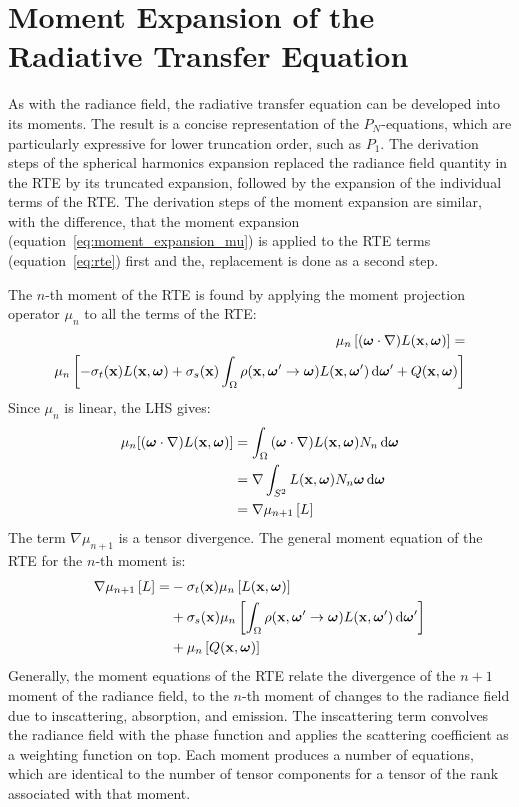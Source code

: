\section{Moment Expansion of the Radiative Transfer Equation}
\label{sec:da_moment_expansion_RTE}

As with the radiance field, the radiative transfer equation can be developed into its moments. The result is a concise representation of the $P_N$-equations, which are particularly expressive for lower truncation order, such as $P_1$. The derivation steps of the spherical harmonics expansion replaced the radiance field quantity in the RTE by its truncated expansion, followed by the expansion of the individual terms of the RTE. The derivation steps of the moment expansion are similar, with the difference, that the moment expansion (equation~\ref{eq:moment_expansion_mu}) is applied to the RTE terms (equation~\ref{eq:rte}) first and the, replacement is done as a second step.

The $n$-th moment of the RTE is found by applying the moment projection operator $\mu_n$ to all the terms of the RTE:
\begin{align*}
\mu_n\left[(\boldsymbol{\mathbf{\omega}}\cdot\nabla)L(\boldsymbol{\mathbf{x}}, \boldsymbol{\mathbf{\omega}})\right]=&\\
\mu_n\left[-\sigma_t(\boldsymbol{\mathbf{x}})L(\boldsymbol{\mathbf{x}}, \boldsymbol{\mathbf{\omega}}) + \sigma_s(\boldsymbol{\mathbf{x}})\int_{\Omega}\rho(\boldsymbol{\mathbf{x}}, \boldsymbol{\mathbf{\omega}}'\rightarrow\boldsymbol{\mathbf{\omega}})L(\boldsymbol{\mathbf{x}}, \boldsymbol{\mathbf{\omega}}')\,\mathrm{d}\boldsymbol{\mathbf{\omega}}' + Q(\boldsymbol{\mathbf{x}}, \boldsymbol{\mathbf{\omega}})\right]
\end{align*}
Since $\mu_n$ is linear, the LHS gives:
\begin{align*}
\mu_n[(\boldsymbol{\mathbf{\omega}} \cdot \nabla)L(\boldsymbol{\mathbf{x}}, \boldsymbol{\mathbf{\omega}})] & = \int_{\Omega}{(\boldsymbol{\mathbf{\omega}}\cdot\nabla)L(\boldsymbol{\mathbf{x}}, \boldsymbol{\mathbf{\omega}})N_n\,\mathrm{d}\boldsymbol{\mathbf{\omega}}}\\
							     & =\nabla\int_{S^2}{L(\boldsymbol{\mathbf{x}}, \boldsymbol{\mathbf{\omega}})N_n\boldsymbol{\mathbf{\omega}}\,\mathrm{d}\boldsymbol{\mathbf{\omega}}} \\
							     & =\nabla\mu_{n+1}\left[L\right]
\end{align*}
The term $\nabla\mu_{n+1}$ is a tensor divergence. The general moment equation of the RTE for the $n$-th moment is:
\begin{align}
\nonumber
\nabla\mu_{n+1}\left[L\right] =&
-\sigma_t(\boldsymbol{\mathbf{x}})\mu_n\left[L(\boldsymbol{\mathbf{x}}, \boldsymbol{\mathbf{\omega}})\right]\\
\label{eq:gme}
&+\sigma_s(\boldsymbol{\mathbf{x}})\mu_n\left[\int_{\Omega}\rho(\boldsymbol{\mathbf{x}}, \boldsymbol{\mathbf{\omega}}'\rightarrow\boldsymbol{\mathbf{\omega}}) L(\boldsymbol{\mathbf{x}}, \boldsymbol{\mathbf{\omega}}')\,\mathrm{d}\boldsymbol{\mathbf{\omega}}'\right]\\
\nonumber
&+\mu_n\left[Q(\boldsymbol{\mathbf{x}}, \boldsymbol{\mathbf{\omega}})\right]
\end{align}
Generally, the moment equations of the RTE relate the divergence of the $n+1$ moment of the radiance field, to the $n$-th moment of changes to the radiance field due to inscattering, absorption, and emission. The inscattering term convolves the radiance field with the phase function and applies the scattering coefficient as a weighting function on top. Each moment produces a number of equations, which are identical to the number of tensor components for a tensor of the rank associated with that moment.


